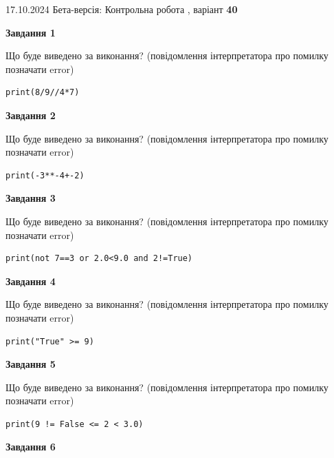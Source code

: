 \documentclass[12pt, ukrainian]{article}
\begin{document}
{\Large{17.10.2024 Бета-версія: Контрольна робота , варіант  \No \textbf { 40 }\par}}
{
\begin {large}
{\begin {center}\textbf{Завдання 1}\end {center}}

Що буде виведено за виконання? (повідомлення інтерпретатора про помилку позначати error)\par
\begin{verbatim}
print(8/9//4*7)
\end{verbatim}

{\begin {center}\textbf{Завдання 2}\end {center}}

Що буде виведено за виконання? (повідомлення інтерпретатора про помилку позначати error)\par
\begin{verbatim}
print(-3**-4+-2)
\end{verbatim}

{\begin {center}\textbf{Завдання 3}\end {center}}

Що буде виведено за виконання? (повідомлення інтерпретатора про помилку позначати error)\par
\begin{verbatim}
print(not 7==3 or 2.0<9.0 and 2!=True)
\end{verbatim}

{\begin {center}\textbf{Завдання 4}\end {center}}

Що буде виведено за виконання? (повідомлення інтерпретатора про помилку позначати error)\par
\begin{verbatim}
print("True" >= 9)
\end{verbatim}

{\begin {center}\textbf{Завдання 5}\end {center}}

Що буде виведено за виконання? (повідомлення інтерпретатора про помилку позначати error)\par
\begin{verbatim}
print(9 != False <= 2 < 3.0)
\end{verbatim}

{\begin {center}\textbf{Завдання 6}\end {center}}


\end{large}}
\end{document}
